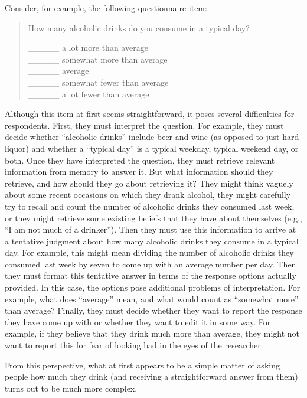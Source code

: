 \documentclass[
]{krantz}
\begin{document}
Consider, for example, the following questionnaire item:

\begin{quote}
How many alcoholic drinks do you consume in a typical day?

\_\_\_\_\_ a lot more than average\\
\_\_\_\_\_ somewhat more than average\\
\_\_\_\_\_ average\\
\_\_\_\_\_ somewhat fewer than average\\
\_\_\_\_\_ a lot fewer than average
\end{quote}

Although this item at first seems straightforward, it poses several difficulties for respondents. First, they must interpret the question. For example, they must decide whether ``alcoholic drinks'' include beer and wine (as opposed to just hard liquor) and whether a ``typical day'' is a typical weekday, typical weekend day, or both. Once they have interpreted the question, they must retrieve relevant information from memory to answer it. But what information should they retrieve, and how should they go about retrieving it? They might think vaguely about some recent occasions on which they drank alcohol, they might carefully try to recall and count the number of alcoholic drinks they consumed last week, or they might retrieve some existing beliefs that they have about themselves (e.g., ``I am not much of a drinker''). Then they must use this information to arrive at a tentative judgment about how many alcoholic drinks they consume in a typical day. For example, this might mean dividing the number of alcoholic drinks they consumed last week by seven to come up with an average number per day. Then they must format this tentative answer in terms of the response options actually provided. In this case, the options pose additional problems of interpretation. For example, what does ``average'' mean, and what would count as ``somewhat more'' than average? Finally, they must decide whether they want to report the response they have come up with or whether they want to edit it in some way. For example, if they believe that they drink much more than average, they might not want to report this for fear of looking bad in the eyes of the researcher.

From this perspective, what at first appears to be a simple matter of asking people how much they drink (and receiving a straightforward answer from them) turns out to be much more complex.
\end{document}
